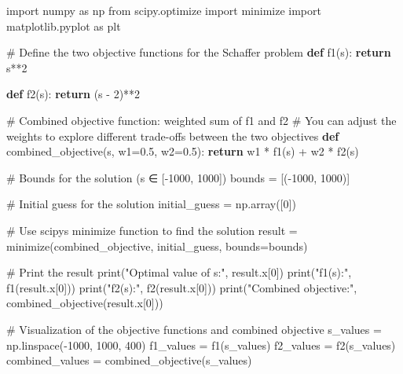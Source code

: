 \documentclass[
  letterpaper,
  DIV=11,
  numbers=noendperiod]{scrreprt}
\newenvironment{Shaded}{\begin{snugshade}}{\end{snugshade}}
\newcommand{\BuiltInTok}[1]{\textcolor[rgb]{0.00,0.23,0.31}{#1}}
\newcommand{\CommentTok}[1]{\textcolor[rgb]{0.37,0.37,0.37}{#1}}
\newcommand{\ControlFlowTok}[1]{\textcolor[rgb]{0.00,0.23,0.31}{\textbf{#1}}}
\newcommand{\DecValTok}[1]{\textcolor[rgb]{0.68,0.00,0.00}{#1}}
\newcommand{\FloatTok}[1]{\textcolor[rgb]{0.68,0.00,0.00}{#1}}
\newcommand{\ImportTok}[1]{\textcolor[rgb]{0.00,0.46,0.62}{#1}}
\newcommand{\KeywordTok}[1]{\textcolor[rgb]{0.00,0.23,0.31}{\textbf{#1}}}
\newcommand{\NormalTok}[1]{\textcolor[rgb]{0.00,0.23,0.31}{#1}}
\newcommand{\OperatorTok}[1]{\textcolor[rgb]{0.37,0.37,0.37}{#1}}
\newcommand{\StringTok}[1]{\textcolor[rgb]{0.13,0.47,0.30}{#1}}
\begin{document}
\begin{Shaded}
\begin{Highlighting}[]
\ImportTok{import}\NormalTok{ numpy }\ImportTok{as}\NormalTok{ np}
\ImportTok{from}\NormalTok{ scipy.optimize }\ImportTok{import}\NormalTok{ minimize}
\ImportTok{import}\NormalTok{ matplotlib.pyplot }\ImportTok{as}\NormalTok{ plt}


\CommentTok{\# Define the two objective functions for the Schaffer problem}
\KeywordTok{def}\NormalTok{ f1(s):}
    \ControlFlowTok{return}\NormalTok{ s}\OperatorTok{**}\DecValTok{2}

\KeywordTok{def}\NormalTok{ f2(s):}
    \ControlFlowTok{return}\NormalTok{ (s }\OperatorTok{{-}} \DecValTok{2}\NormalTok{)}\OperatorTok{**}\DecValTok{2}

\CommentTok{\# Combined objective function: weighted sum of f1 and f2}
\CommentTok{\# You can adjust the weights to explore different trade{-}offs between the two objectives}
\KeywordTok{def}\NormalTok{ combined\_objective(s, w1}\OperatorTok{=}\FloatTok{0.5}\NormalTok{, w2}\OperatorTok{=}\FloatTok{0.5}\NormalTok{):}
    \ControlFlowTok{return}\NormalTok{ w1 }\OperatorTok{*}\NormalTok{ f1(s) }\OperatorTok{+}\NormalTok{ w2 }\OperatorTok{*}\NormalTok{ f2(s)}

\CommentTok{\# Bounds for the solution (s ∈ [{-}1000, 1000])}
\NormalTok{bounds }\OperatorTok{=}\NormalTok{ [(}\OperatorTok{{-}}\DecValTok{1000}\NormalTok{, }\DecValTok{1000}\NormalTok{)]}

\CommentTok{\# Initial guess for the solution}
\NormalTok{initial\_guess }\OperatorTok{=}\NormalTok{ np.array([}\DecValTok{0}\NormalTok{])}

\CommentTok{\# Use scipy\textquotesingle{}s minimize function to find the solution}
\NormalTok{result }\OperatorTok{=}\NormalTok{ minimize(combined\_objective, initial\_guess, bounds}\OperatorTok{=}\NormalTok{bounds)}

\CommentTok{\# Print the result}
\BuiltInTok{print}\NormalTok{(}\StringTok{"Optimal value of s:"}\NormalTok{, result.x[}\DecValTok{0}\NormalTok{])}
\BuiltInTok{print}\NormalTok{(}\StringTok{"f1(s):"}\NormalTok{, f1(result.x[}\DecValTok{0}\NormalTok{]))}
\BuiltInTok{print}\NormalTok{(}\StringTok{"f2(s):"}\NormalTok{, f2(result.x[}\DecValTok{0}\NormalTok{]))}
\BuiltInTok{print}\NormalTok{(}\StringTok{"Combined objective:"}\NormalTok{, combined\_objective(result.x[}\DecValTok{0}\NormalTok{]))}

\CommentTok{\# Visualization of the objective functions and combined objective}
\NormalTok{s\_values }\OperatorTok{=}\NormalTok{ np.linspace(}\OperatorTok{{-}}\DecValTok{1000}\NormalTok{, }\DecValTok{1000}\NormalTok{, }\DecValTok{400}\NormalTok{)}
\NormalTok{f1\_values }\OperatorTok{=}\NormalTok{ f1(s\_values)}
\NormalTok{f2\_values }\OperatorTok{=}\NormalTok{ f2(s\_values)}
\NormalTok{combined\_values }\OperatorTok{=}\NormalTok{ combined\_objective(s\_values)}


\end{Highlighting}
\end{Shaded}
\end{document}
